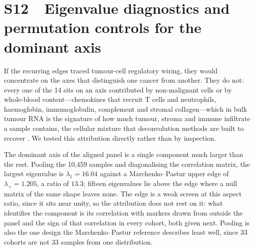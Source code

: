 \documentclass[11pt]{article}
\begin{document}
\section*{S12\ \ Eigenvalue diagnostics and permutation controls for the dominant axis}

If the recurring edges traced tumour-cell regulatory wiring, they would concentrate on the axes that distinguish one cancer from another. They do not: every one of the 14 sits on an axis contributed by non-malignant cells or by whole-blood content---chemokines that recruit T cells and neutrophils, haemoglobin, immunoglobulin, complement and stromal collagen---which in bulk tumour RNA is the signature of how much tumour, stroma and immune infiltrate a sample contains, the cellular mixture that deconvolution methods are built to recover \citep{white2024deconvolution}. We tested this attribution directly rather than by inspection.

The dominant axis of the aligned panel is a single component much larger than the rest.
Pooling the 10{,}459 samples and diagonalising the correlation matrix, the largest
eigenvalue is $\lambda_1 = 16.04$ against a Marchenko--Pastur upper edge of
$\lambda_+ = 1.205$, a ratio of $13.3$; fifteen eigenvalues lie above the edge where a null
matrix of the same shape leaves none. The edge is a weak screen at this aspect ratio, since
it sits near unity, so the attribution does not rest on it: what identifies the component is
its correlation with markers drawn from outside the panel and the sign of that correlation
in every cohort, both given next. Pooling is also the one design the Marchenko--Pastur
reference describes least well, since 33 cohorts are not 33 samples from one distribution.
\end{document}
